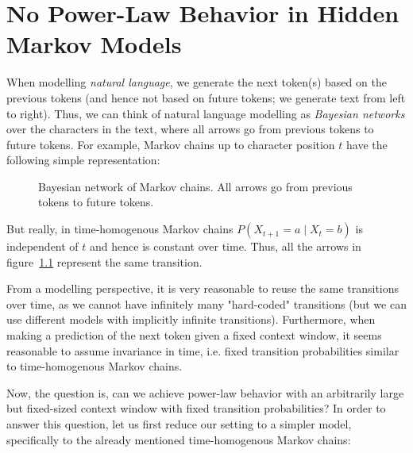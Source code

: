 \documentclass[../../main.tex]{subfiles}
\begin{document}
\chapter{No Power-Law Behavior in Hidden Markov Models}
    \label{section:no_power-law_in_hidden_markov_models}
    When modelling \emph{natural language}, we generate the next token(s) based on the previous tokens (and hence not based on future tokens; we generate text from left to right). Thus, we can think of natural language modelling as \emph{Bayesian networks} over the characters in the text, where all arrows go from previous tokens to future tokens. For example, Markov chains up to character position $t$ have the following simple representation:

    \begin{figure}[h]
        \center
        \caption{Bayesian network of Markov chains. All arrows go from previous tokens to future tokens.}
        \label{fig:bayesian_network_markov_chain}
    \end{figure}

    But really, in time-homogenous Markov chains $P(X_{t + 1} = a \mid X_t = b)$ is independent of $t$ and hence is constant over time. Thus, all the arrows in figure~\ref{fig:bayesian_network_markov_chain} represent the same transition.

    From a modelling perspective, it is very reasonable to reuse the same transitions over time, as we cannot have infinitely many "hard-coded" transitions (but we can use different models with implicitly infinite transitions). Furthermore, when making a prediction of the next token given a fixed context window, it seems reasonable to assume invariance in time, i.e. fixed transition probabilities similar to time-homogenous Markov chains.

    Now, the question is, can we achieve power-law behavior with an arbitrarily large but fixed-sized context window with fixed transition probabilities? In order to answer this question, let us first reduce our setting to a simpler model, specifically to the already mentioned time-homogenous Markov chains:
    
\end{document}
